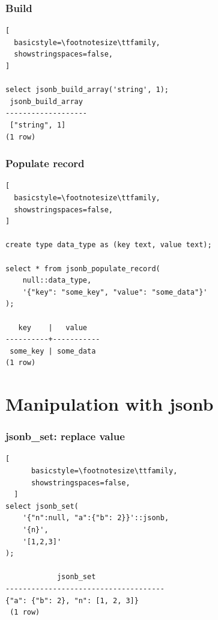 \documentclass[14pt, compress]{beamer}
\begin{document}
\begin{frame}[fragile]
  \frametitle{Build}

\begin{lstlisting}[
  basicstyle=\footnotesize\ttfamily,
  showstringspaces=false,
]

select jsonb_build_array('string', 1);                                                                                                                  
 jsonb_build_array 
-------------------
 ["string", 1]
(1 row)

\end{lstlisting}

\end{frame}

\begin{frame}[fragile]
  \frametitle{Populate record}

\begin{lstlisting}[
  basicstyle=\footnotesize\ttfamily,
  showstringspaces=false,
]

create type data_type as (key text, value text);

select * from jsonb_populate_record(
    null::data_type,
    '{"key": "some_key", "value": "some_data"}'
);

   key    |   value   
----------+-----------
 some_key | some_data
(1 row)

\end{lstlisting}

\end{frame}


\section{Manipulation with jsonb}

\begin{frame}[fragile]
  \frametitle{jsonb\_set: replace value}

  \begin{lstlisting}[
      basicstyle=\footnotesize\ttfamily,
      showstringspaces=false,
  ]
select jsonb_set(
    '{"n":null, "a":{"b": 2}}'::jsonb,
    '{n}',
    '[1,2,3]'
);

            jsonb_set                                 
-------------------------------------
{"a": {"b": 2}, "n": [1, 2, 3]}
 (1 row)
 
  \end{lstlisting}

\end{frame}
\end{document}
